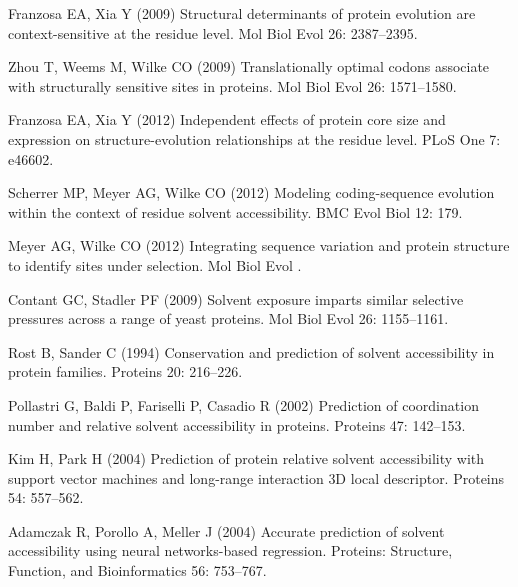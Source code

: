 \documentclass[11pt]{article}
\begin{document}
\begin{thebibliography}{10}
Franzosa EA, Xia Y (2009) Structural determinants of protein evolution are
  context-sensitive at the residue level.
\newblock Mol Biol Evol 26: 2387--2395.

Zhou T, Weems M, Wilke CO (2009) Translationally optimal codons associate with
  structurally sensitive sites in proteins.
\newblock Mol Biol Evol 26: 1571--1580.

Franzosa EA, Xia Y (2012) Independent effects of protein core size and
  expression on structure-evolution relationships at the residue level.
\newblock PLoS One 7: e46602.

Scherrer MP, Meyer AG, Wilke CO (2012) Modeling coding-sequence evolution
  within the context of residue solvent accessibility.
\newblock BMC Evol Biol 12: 179.

Meyer AG, Wilke CO (2012) Integrating sequence variation and protein structure
  to identify sites under selection.
\newblock Mol Biol Evol .

Contant GC, Stadler PF (2009) Solvent exposure imparts similar selective
  pressures across a range of yeast proteins.
\newblock Mol Biol Evol 26: 1155--1161.

Rost B, Sander C (1994) Conservation and prediction of solvent accessibility in
  protein families.
\newblock Proteins 20: 216--226.

Pollastri G, Baldi P, Fariselli P, Casadio R (2002) Prediction of coordination
  number and relative solvent accessibility in proteins.
\newblock Proteins 47: 142--153.

Kim H, Park H (2004) Prediction of protein relative solvent accessibility with
  support vector machines and long-range interaction {3D} local descriptor.
\newblock Proteins 54: 557--562.

Adamczak R, Porollo A, Meller J (2004) Accurate prediction of solvent
  accessibility using neural networks-based regression.
\newblock Proteins: Structure, Function, and Bioinformatics 56: 753--767.


\end{thebibliography}
\end{document}
